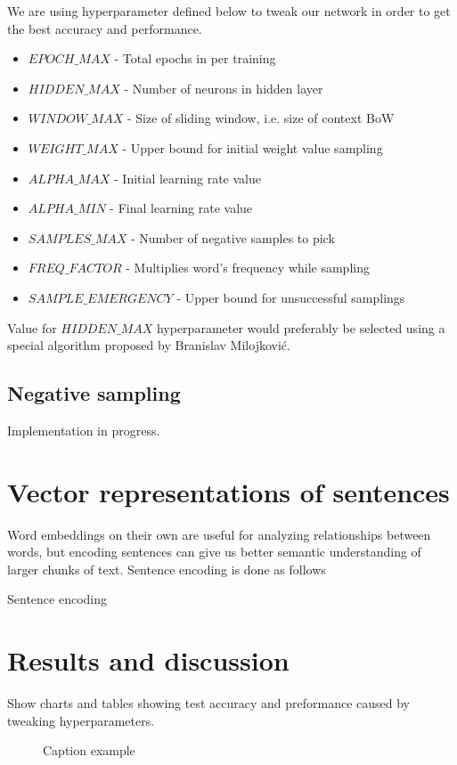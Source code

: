 \documentclass{article}
\newcommand{\SetAlgoStyle}{
	\SetAlgoNoLine
	\SetAlgoNoEnd
	\DontPrintSemicolon
}
\newcommand{\fig}[2]{
	\begin{figure}[!htb]
		\center{\texttt{[image: res/\#1]}}
		\caption{\label{fig:caption} #2}
	\end{figure}
}
\begin{document}
We are using hyperparameter defined below to tweak our network in order to get the best accuracy and performance.

\begin{itemize}
	\item $EPOCH\_MAX$ - Total epochs in per training
	\item $HIDDEN\_MAX$ - Number of neurons in hidden layer
	\item $WINDOW\_MAX$ - Size of sliding window, i.e. size of context BoW
	\item $WEIGHT\_MAX$ - Upper bound for initial weight value sampling
	\item $ALPHA\_MAX$ - Initial learning rate value
	\item $ALPHA\_MIN$ - Final learning rate value
	\item $SAMPLES\_MAX$ - Number of negative samples to pick
	\item $FREQ\_FACTOR$ - Multiplies word's frequency while sampling
	\item $SAMPLE\_EMERGENCY$ - Upper bound for unsuccessful samplings
\end{itemize}

\medbreak

Value for $HIDDEN\_MAX$ hyperparameter would preferably be selected using a
special algorithm proposed by Branislav Milojković.

\subsection{Negative sampling}

Implementation in progress.

\pagebreak

\section{Vector representations of sentences}

Word embeddings on their own are useful for analyzing relationships between
words, but encoding sentences can give us better semantic understanding of
larger chunks of text. Sentence encoding is done as follows

\begin{algorithm}[H]
	\SetAlgoStyle
	\caption{Sentence encoding}
\end{algorithm}

\pagebreak

\section{Results and discussion}

Show charts and tables showing test accuracy and preformance caused by tweaking
hyperparameters.

\fig{chart}{Caption example}
\end{document}
